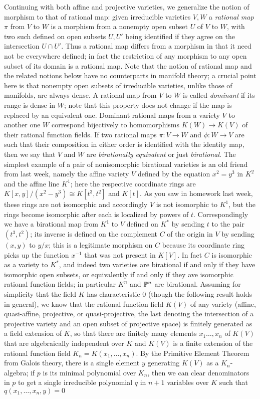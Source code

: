 Continuing with both affine and projective varieties, we generalize the notion of morphism to that of rational map:  given irreducible varieties $V,W$ a {\sl rational map} $\pi$ from $V$ to $W$ is a morphism from a nonempty open subset $U$ of $V$ to $W$, with two such defined on open subsets $U,U'$ being identified if they agree on the intersection $U\cap U'$.  Thus a rational map differs from a morphism in that it need not be everywhere defined; in fact the restriction of any morphism to any open subset of its domain is a rational map.  Note that the notion of rational map and the related notions below have no counterparts in manifold theory; a crucial point here is that nonempty open subsets of irreducible varieties, unlike those of manifolds, are always dense.  A rational map from $V$ to $W$ is called {\sl dominant} if its range is dense in $W$; note that this property does not change if the map is replaced by an equivalent one.  Dominant rational maps from a variety $V$ to another one $W$ correspond bijectively to homomorphisms $K(W)\rightarrow K(V)$ of their rational function fields.  If two rational maps $\pi:V\rightarrow W$ and $\phi:W\rightarrow V$ are such that their composition in either order is identified with the identity map, then we say that $V$ and $W$ are {\sl birationally equivalent} or just {\sl birational}.  The simplest example of a pair of nonisomorphic birational varieties is an old friend from last week, namely the affine variety $V$ defined by the equation $x^2 = y^3$ in $K^2$ and the affine line $K^1$; here the respective coordinate rings are $K[x,y]/(x^2 - y^3)\cong K[t^3,t^2]$ and $K[t]$.  As you saw in homework last week, these rings are not isomorphic and accordingly $V$ is not isomorphic to $K^1$, but the rings become isomorphic after each is localized by powers of $t$.  Correspondingly we have a birational map from $K^1$ to $V$ defined on $K^*$ by sending $t$ to the pair $(t^3,t^2)$; its inverse is defined on the complement $C$ of the origin in $V$ by sending $(x,y)$ to $y/x$; this is a legitimate morphism on $C$ because its coordinate ring picks up the function $x^{-1}$ that was not present in $K[V]$.  In fact $C$ is isomorphic as a variety to $K^*$, and indeed two varieties are birational if and only if they have isomorphic open subsets, or equivalently if and only if they ave isomorphic rational function fields; in particular $K^n$ and $\Bbb P^n$ are birational.  Assuming for simplicity that the field $K$ has characteristic 0 (though the following result holds in general), we know that the rational function field $K(V)$ of any variety (affine, quasi-affine, projective, or quasi-projective, the last denoting the intersection of a projective variety and an open subset of projective space) is finitely generated as a field extension of $K$, so that there are finitely many elements $x_1\ldots,x_n$ of $K(V)$ that are algebraically independent over $K$ and $K(V)$ is a finite extension of the rational function field $K_n=K(x_1,\ldots,x_n)$.  By the Primitive Element Theorem from Galois theory, there is a single element $y$ generating $K(V)$ as a $K_n$-algebra; if $p$ is its minimal polynomial over $K_n$, then we can clear denominators in $p$ to get a single irreducible polynomial $q$ in $n+1$ variables over $K$ such that $q(x_1,\ldots,x_n,y) = 0$ 
